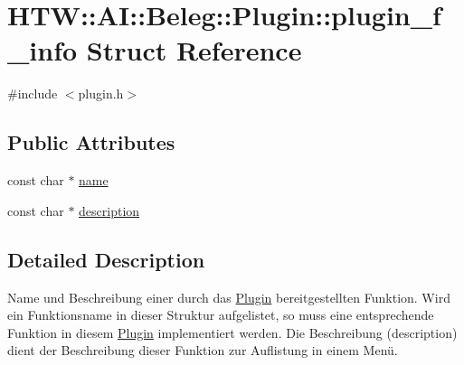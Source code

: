 \hypertarget{struct_h_t_w_1_1_a_i_1_1_beleg_1_1_plugin_1_1plugin__f__info}{\section{H\-T\-W\-:\-:A\-I\-:\-:Beleg\-:\-:Plugin\-:\-:plugin\-\_\-f\-\_\-info Struct Reference}
\label{struct_h_t_w_1_1_a_i_1_1_beleg_1_1_plugin_1_1plugin__f__info}
}


{\ttfamily \#include $<$plugin.\-h$>$}

\subsection*{Public Attributes}
\begin{DoxyCompactItemize}
\item 
const char $\ast$ \hyperlink{struct_h_t_w_1_1_a_i_1_1_beleg_1_1_plugin_1_1plugin__f__info_a60556440848508c263f94b80497bfab8}{name}
\item 
const char $\ast$ \hyperlink{struct_h_t_w_1_1_a_i_1_1_beleg_1_1_plugin_1_1plugin__f__info_a3518493d520eb0f08384be7d2189403b}{description}
\end{DoxyCompactItemize}


\subsection{Detailed Description}
Name und Beschreibung einer durch das \hyperlink{namespace_h_t_w_1_1_a_i_1_1_beleg_1_1_plugin}{Plugin} bereitgestellten Funktion. Wird ein Funktionsname in dieser Struktur aufgelistet, so muss eine entsprechende Funktion in diesem \hyperlink{namespace_h_t_w_1_1_a_i_1_1_beleg_1_1_plugin}{Plugin} implementiert werden. Die Beschreibung (description) dient der Beschreibung dieser Funktion zur Auflistung in einem Menü. 

